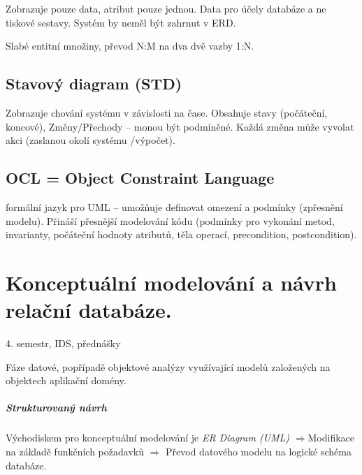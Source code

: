 \documentclass[a4paper, 11pt]{report}
\begin{document}
Zobrazuje pouze data, atribut pouze jednou. Data pro účely databáze a ne tiskové sestavy. Systém by neměl být zahrnut v ERD.

Slabé entitní množiny, převod N:M na dva dvě vazby 1:N.

\section{Stavový diagram (STD)}
Zobrazuje chování systému v závislosti na čase. Obsahuje stavy (počáteční, koncové), Změny/Přechody -- monou být podmíněné. Každá změna může vyvolat akci (zaslanou okolí systému /výpočet).


\section{OCL = Object Constraint Language}
formální jazyk pro UML -- umožňuje definovat omezení a podmínky (zpřesnění modelu). Přináší přesnější modelování kódu (podmínky pro vykonání metod, invarianty, počáteční hodnoty atributů, těla operací, precondition, postcondition).


































\chapter{Konceptuální modelování a návrh relační databáze.} \label{cha:32}

4. semestr, IDS, přednášky

Fáze datové, popřípadě objektové analýzy využívající modelů založených na objektech aplikační domény.

\paragraph{Strukturovaný návrh}
Východiskem pro konceptuální modelování je \emph{ER Diagram (UML)} $\Rightarrow$Modifikace na základě funkčních požadavků $\Rightarrow$ Převod datového modelu na logické schéma databáze.
\end{document}
